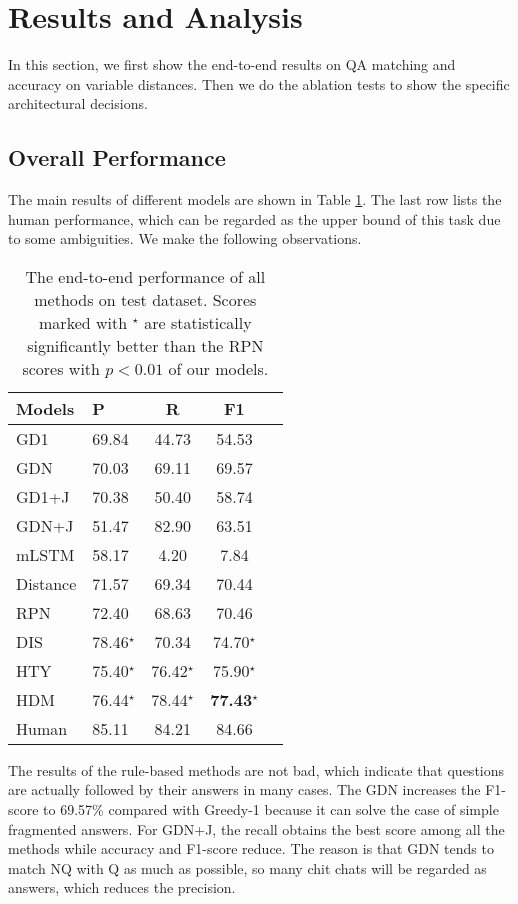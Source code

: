 \section{Results and Analysis}
\label{sec:results}
In this section, we first show the end-to-end results on QA matching and accuracy on variable distances. Then we do the ablation tests to show the specific architectural decisions.  

\subsection{Overall Performance}
The main results of different models are shown in Table \ref{tab:mainResults}. The last row lists the human performance, which can be regarded as the upper bound of this task due to some ambiguities. We make the following
observations. 

\begin{table}[th]
	\small
	\centering
	\begin{tabular}{p{1cm}<{\centering}p{1cm}<{\centering}ccc}
		\toprule[1.5pt]
		Models &P&R& F1\\
		\midrule[1pt]
		GD1&69.84&44.73&54.53\\
		GDN  &70.03&69.11&69.57\\
		GD1+J&70.38&50.40&58.74\\
		GDN+J&51.47&82.90&63.51\\
		\hline
		mLSTM&58.17&4.20&7.84\\
		Distance&71.57&69.34&70.44\\
		RPN&72.40&68.63&70.46\\
\hline
		DIS&78.46$^\star$&70.34&74.70$^\star$\\
		HTY&75.40$^\star$&76.42$^\star$&75.90$^\star$\\
		HDM&76.44$^\star$&78.44$^\star$&\textbf{77.43}$^\star$\\
		\hline
		Human &85.11&84.21&84.66\\
		\bottomrule[1.5pt]
	\end{tabular}
	\caption{The end-to-end performance of all methods on test dataset. Scores marked with $^\star$ are statistically significantly better than the RPN scores with $p<0.01$ of our models.}
	\label{tab:mainResults}
\end{table}

 

The results of the rule-based methods are not bad, which indicate that questions are actually followed by their answers in many cases. The GDN increases the F1-score to 69.57\% compared with Greedy-1 because it can solve the case of simple fragmented answers. For GDN+J, the recall obtains the best score among all the methods while accuracy and F1-score reduce. The reason is that GDN tends to match NQ with Q as much as possible, so many chit chats will be regarded as answers, which reduces the precision.

